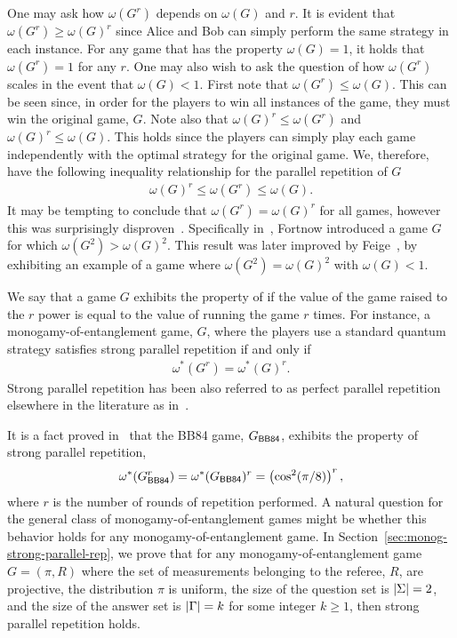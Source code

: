 One may ask how $\omega(G^r)$ depends on $\omega(G)$ and $r$. It is evident that $\omega(G^r) \geq \omega(G)^r$ since Alice and Bob can simply perform the same strategy in each instance. For any game that has the property $\omega(G) = 1$, it holds that $\omega(G^r) = 1$ for any $r$. One may also wish to ask the question of how $\omega(G^r)$ scales in the event that $\omega(G) < 1$. First note that $\omega(G^r) \leq \omega(G)$. This can be seen since, in order for the players to win all instances of the game, they must win the original game, $G$. Note also that $\omega(G)^r \leq \omega(G^r)$ and $\omega(G)^r \leq \omega(G)$. This holds since the players can simply play each game independently with the optimal strategy for the original game. We, therefore, have the following inequality relationship for the parallel repetition of $G$\
\begin{align}
	\omega(G)^r \leq \omega(G^r) \leq \omega(G). 
\end{align} 
It may be tempting to conclude that $\omega(G^r) = \omega(G)^r$ for all games, however this was surprisingly disproven~\cite{Fortnow1990, Feige1991, Verbitsky1996, Feige2002}. Specifically in~\cite{Fortnow1990}, Fortnow introduced a game $G$ for which $\omega(G^2) > \omega(G)^2$. This result was later improved by Feige~\cite{Feige1991}, by exhibiting an example of a game where $\omega(G^2) = \omega(G)^2$ with $\omega(G) < 1$.  

We say that a game $G$ exhibits the property of  if the value of the game raised to the $r$ power is equal to the value of running the game $r$ times. For instance, a monogamy-of-entanglement game, $G$, where the players use a standard quantum strategy satisfies strong parallel repetition if and only if
\begin{align}
	\omega^*(G^r) = \omega^*(G)^r. 
\end{align}
Strong parallel repetition has been also referred to as perfect parallel repetition elsewhere in the literature as in~\cite{Cleve2008}. 

It is a fact proved in~\cite{Tomamichel2013} that the BB84 game, $G_{\BB84}$, exhibits the property of strong parallel repetition,
\begin{align}
	\omega^*(G_{\BB84}^r) = \omega^*(G_{\BB84})^r = \left( \cos^2(\pi/8) \right)^r,
\end{align}
where $r$ is the number of rounds of repetition performed. A natural question for the general class of monogamy-of-entanglement games might be whether this behavior holds for any monogamy-of-entanglement game. In Section~\ref{sec:monog-strong-parallel-rep}, we prove that for any monogamy-of-entanglement game $G = (\pi,R)$ where the set of measurements belonging to the referee, $R$, are projective, the distribution $\pi$ is uniform, the size of the question set is $\left\lvert \Sigma \right\rvert = 2$, and the size of the answer set is $\left\lvert \Gamma \right\rvert = k$ for some integer $k \geq 1$, then strong parallel repetition holds. 


